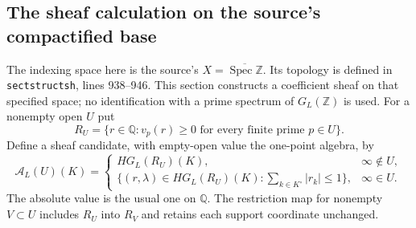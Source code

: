 \subsection{The sheaf calculation on the source's compactified base}

The indexing space here is the source's
$X=\overline{\operatorname{Spec}\mathbb Z}$.  Its topology is
defined in \texttt{sectstructsh}, lines 938--946.  This section
constructs a coefficient sheaf on that specified space; no
identification with a prime spectrum of $G_L(\mathbb Z)$ is used.
For a nonempty open $U$ put
\begin{equation}\tag{HG29}
 R_U=\{r\in\mathbb Q:v_p(r)\ge0\text{ for every finite prime }p\in U\}.
\end{equation}
Define a sheaf candidate, with empty-open value the one-point
algebra, by
\begin{equation}\tag{HG30}
 \mathcal A_L(U)(K)=
 \begin{cases}
 HG_L(R_U)(K),&\infty\notin U,\\
 \{(r,\lambda)\in HG_L(R_U)(K):\sum_{k\in K^\circ}|r_k|\le1\},
       &\infty\in U.
 \end{cases}
\end{equation}
The absolute value is the usual one on $\mathbb Q$.  The restriction
map for nonempty $V\subset U$ includes $R_U$ into $R_V$ and
retains each support coordinate unchanged.

